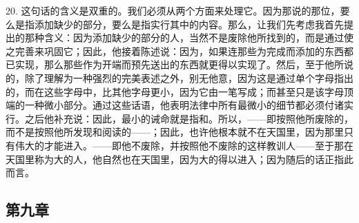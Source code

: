 20. 这句话的含义是双重的。我们必须从两个方面来处理它。因为那说的那位，要么是指添加缺少的部分，要么是指实行其中的内容。那么，让我们先考虑我首先提出的那种含义：因为添加缺少的部分的人，当然不是废除他所找到的，而是通过使之完善来巩固它；因此，他接着陈述说：因为，如果连那些为完成而添加的东西都已实现，那么那些作为开端而预先送出的东西就更得以实现了。然后，至于他所说的，除了理解为一种强烈的完美表述之外，别无他意，因为这是通过单个字母指出的，而在这些字母中，比其他字母更小，因为它由一笔写成；而甚至只是该字母顶端的一种微小部分。通过这些话语，他表明法律中所有最微小的细节都必须付诸实行。之后他补充说：因此，最小的诫命就是指和。所以，——即按照他所废除的，而不是按照他所发现和阅读的——；因此，也许他根本就不在天国里，因为那里只有伟大的才能进入。——即他不废除，并按照他不废除的这样教训人——至于那在天国里称为大的人，他自然也在天国里，因为大的得以进入；因为随后的话正指此而言。\par


\subsection{第九章}

